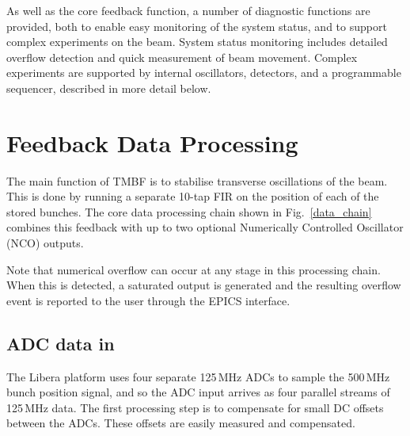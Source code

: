 \documentclass{jacow}
\begin{document}
As well as the core feedback function, a number of diagnostic functions are
provided, both to enable easy monitoring of the system status, and to support
complex experiments on the beam.  System status monitoring includes detailed
overflow detection and quick measurement of beam movement.  Complex experiments
are supported by internal oscillators, detectors, and a programmable sequencer,
described in more detail below.


\begin{figure*}[t]
\begin{centering}

\end{centering}
\caption{
This is the core data processing chain in the TMBF processor.  Data processing
starts by adding a DC offset to each of the four ADC channels to compensate for
static ADC errors, followed by a 3-tap filter to compensate for high frequency
phase errors in the front end.  The minimum and maximum value per bunch of both
the ADC and DAC streams is captured for display.  A 10-tap filter with
programmable gain (in 6\,dB steps) is applied in turn to each bunch in the ring.
The output multiplexer adds any combination of its three inputs, which is then
scaled by a bunch specific gain.  Finally an output pre-emphasis filter corrects
for amplifier errors and is followed by a delay line to correctly close the
loop.
}
\label{data_chain}
\end{figure*}


\section{Feedback Data Processing}

The main function of TMBF is to stabilise transverse oscillations of the beam.
This is done by running a separate 10-tap FIR on the position of each of the
stored bunches.  The core data processing chain shown in Fig.~\ref{data_chain}
combines this feedback with up to two optional Numerically Controlled Oscillator
(NCO) outputs.

Note that numerical overflow can occur at any stage in this processing chain.
When this is detected, a saturated output is generated and the resulting
overflow event is reported to the user through the EPICS interface.


\subsection{ADC data in}

The Libera platform uses four separate 125\,MHz ADCs to sample the 500\,MHz
bunch position signal, and so the ADC input arrives as four parallel streams of
125\,MHz data.  The first processing step is to compensate for small DC offsets
between the ADCs.  These offsets are easily measured and compensated.
\end{document}
